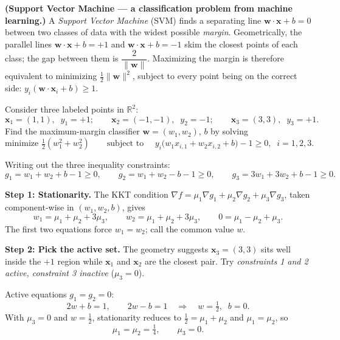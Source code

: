 \exampleline
\begin{example}
\noindent \textbf{(Support Vector Machine --- a classification problem from machine learning.)} A \textit{Support Vector Machine} (SVM)  finds a separating line $\mathbf{w}\cdot\mathbf{x} + b = 0$ between two classes of data with the widest possible \textit{margin}. Geometrically, the parallel lines $\mathbf{w}\cdot\mathbf{x} + b = +1$ and $\mathbf{w}\cdot\mathbf{x} + b = -1$ skim the closest points of each class; the gap between them is $\dfrac{2}{\|\mathbf{w}\|}$. Maximizing the margin is therefore equivalent to minimizing $\tfrac{1}{2}\|\mathbf{w}\|^2$, subject to every point being on the correct side: $y_i(\mathbf{w}\cdot\mathbf{x}_i + b) \geq 1$.

\noindent Consider three labeled points in $\mathbb{R}^2$:
\[
\mathbf{x}_1 = (1,1), \;\; y_1 = +1; \qquad \mathbf{x}_2 = (-1,-1), \;\; y_2 = -1; \qquad \mathbf{x}_3 = (3,3), \;\; y_3 = +1.
\]
Find the maximum-margin classifier $\mathbf{w} = (w_1, w_2)$, $b$ by solving
\[
\text{minimize } \tfrac{1}{2}(w_1^2 + w_2^2) \qquad \text{subject to } \quad y_i\bigl(w_1 x_{i,1} + w_2 x_{i,2} + b\bigr) - 1 \geq 0, \;\; i = 1,2,3.
\]

\begin{solution}
\noindent Writing out the three inequality constraints:
\[
g_1 = w_1 + w_2 + b - 1 \geq 0, \qquad g_2 = w_1 + w_2 - b - 1 \geq 0, \qquad g_3 = 3w_1 + 3w_2 + b - 1 \geq 0.
\]

\noindent\textbf{Step 1: Stationarity.} The KKT condition $\nabla f = \mu_1 \nabla g_1 + \mu_2 \nabla g_2 + \mu_3 \nabla g_3$, taken component-wise in $(w_1, w_2, b)$, gives
\[
w_1 = \mu_1 + \mu_2 + 3\mu_3, \qquad w_2 = \mu_1 + \mu_2 + 3\mu_3, \qquad 0 = \mu_1 - \mu_2 + \mu_3.
\]
The first two equations force $w_1 = w_2$; call the common value $w$.

\noindent\textbf{Step 2: Pick the active set.} The geometry suggests $\mathbf{x}_3 = (3,3)$ sits well inside the $+1$ region while $\mathbf{x}_1$ and $\mathbf{x}_2$ are the closest pair. Try \textit{constraints 1 and 2 active, constraint 3 inactive} ($\mu_3 = 0$).

Active equations $g_1 = g_2 = 0$:
\[
2w + b = 1, \qquad 2w - b = 1 \quad \Longrightarrow \quad w = \tfrac{1}{2}, \;\; b = 0.
\]
With $\mu_3 = 0$ and $w = \tfrac{1}{2}$, stationarity reduces to $\tfrac{1}{2} = \mu_1 + \mu_2$ and $\mu_1 = \mu_2$, so
\[
\mu_1 = \mu_2 = \tfrac{1}{4}, \qquad \mu_3 = 0.
\]


\end{solution}
\end{example}
